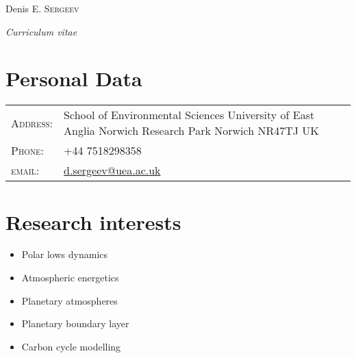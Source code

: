 \documentclass[a4paper,11pt]{article}
\newlength{\mycol}
\begin{document}
\pagestyle{empty} %
\flushleft

\par{\centering
		{\Huge Denis E. \textsc{Sergeev} \par
		 \normalsize \textit{Curriculum vitae}
		
	}\bigskip\par}

\section{Personal Data}
\renewcommand{\arraystretch}{1.2}
\begin{tabu} to 
    \textsc{Address:}   & School of Environmental Sciences \newline University of East Anglia \newline Norwich Research Park \newline Norwich \newline NR47TJ \newline UK \\
    \textsc{Phone:}     & +44 7518298358\\
    \textsc{email:}     & \href{mailto:d.sergeev@uea.ac.uk}{d.sergeev@uea.ac.uk}
\end{tabu}
\renewcommand{\arraystretch}{1}

 \renewcommand{\labelitemi}{\scriptsize$\blacksquare$} 

\section{Research interests}
\begin{itemize}
 \item Polar lows dynamics
 \item Atmospheric energetics
 \item Planetary atmospheres
 \item Planetary boundary layer
 \item Carbon cycle modelling
\end{itemize}
\end{document}
